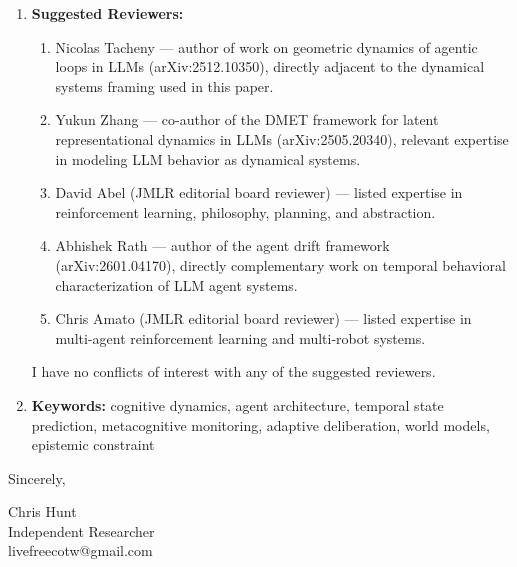 \begin{enumerate}
\item \textbf{Suggested Reviewers:}
\begin{enumerate}
\item Nicolas Tacheny --- author of work on geometric dynamics of agentic loops in LLMs (arXiv:2512.10350), directly adjacent to the dynamical systems framing used in this paper.
\item Yukun Zhang --- co-author of the DMET framework for latent representational dynamics in LLMs (arXiv:2505.20340), relevant expertise in modeling LLM behavior as dynamical systems.
\item David Abel (JMLR editorial board reviewer) --- listed expertise in reinforcement learning, philosophy, planning, and abstraction.
\item Abhishek Rath --- author of the agent drift framework (arXiv:2601.04170), directly complementary work on temporal behavioral characterization of LLM agent systems.
\item Chris Amato (JMLR editorial board reviewer) --- listed expertise in multi-agent reinforcement learning and multi-robot systems.
\end{enumerate}
I have no conflicts of interest with any of the suggested reviewers.

\item \textbf{Keywords:} cognitive dynamics, agent architecture, temporal state prediction, metacognitive monitoring, adaptive deliberation, world models, epistemic constraint
\end{enumerate}

\bigskip

Sincerely,

\medskip

Chris Hunt\\
Independent Researcher\\
livefreecotw@gmail.com


